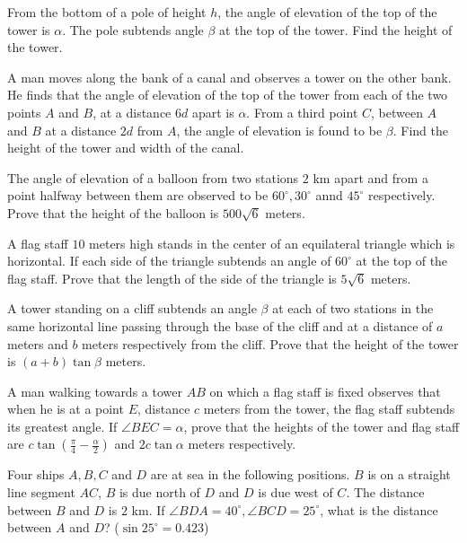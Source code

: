 \item From the bottom of a pole of height $h$, the angle of elevation of the top of the tower is $\alpha$. The pole
  subtends angle $\beta$ at the top of the tower. Find the height of the tower.

\item A man moves along the bank of a canal and observes a tower on the other bank. He finds that the angle of elevation of the top
  of the tower from each of the two points $A$ and $B$, at a distance $6d$ apart is $\alpha$. From a
  third point $C$, between $A$ and $B$ at a distance $2d$ from $A$, the angle of elevation is
  found to be $\beta$. Find the height of the tower and width of the canal.

\item The angle of elevation of a balloon from two stations $2$ km apart and from a point halfway between them are observed to
  be $60^\circ, 30^\circ$ annd $45^\circ$ respectively. Prove that the height of the balloon is $500\sqrt{6}$
  meters.

\item A flag staff $10$ meters high stands in the center of an equilateral triangle which is horizontal. If each side of the
  triangle subtends an angle of $60^\circ$ at the top of the flag staff. Prove that the length of the side of the triangle
  is $5\sqrt{6}$ meters.

\item A tower standing on a cliff subtends an angle $\beta$ at each of two stations in the same horizontal line passing
  through the base of the cliff and at a distance of $a$ meters and $b$ meters respectively from the cliff. Prove
  that the height of the tower is $(a + b)\tan\beta$ meters.

\item A man walking towards a tower $AB$ on which a flag staff is fixed observes that when he is at a point $E$,
  distance $c$ meters from the tower, the flag staff subtends its greatest angle. If $\angle BEC = \alpha$, prove
  that the heights of the tower and flag staff are $c\tan\left(\frac{\pi}{4} - \frac{\alpha}{2}\right)$ and
  $2c\tan\alpha$ meters respectively.

\item Four ships $A, B, C$ and $D$ are at sea in the following positions. $B$ is on a straight line segment
  $AC$, $B$ is due north of $D$ and $D$ is due west of $C$. The distance between $B$ and
  $D$ is $2$ km. If $\angle BDA = 40^\circ, \angle BCD = 25^\circ$, what is the distance between $A$ and
  $D$? ($\sin25^\circ = 0.423$)

